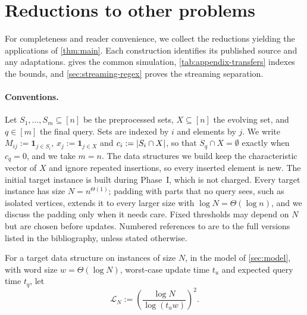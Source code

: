 \appendix
{}

\section{Reductions to other problems}\label{sec:graphs}

For completeness and reader convenience, we collect the reductions yielding the applications of \cref{thm:main}. Each construction identifies its published source and any adaptations.  gives the common simulation, \cref{tab:appendix-transfers} indexes the bounds, and \cref{sec:streaming-regex} proves the streaming separation.

\paragraph{Conventions.}
Let $S_1,\dots,S_m\subseteq[n]$ be the preprocessed sets, $X\subseteq[n]$ the evolving set, and $q\in[m]$ the final query. Sets are indexed by $i$ and elements by $j$. We write $M_{ij}:=\mathbf 1_{j\in S_i}$, $x_j:=\mathbf 1_{j\in X}$ and $c_i:=\left|S_i\cap X\right|$, so that $S_q\cap X=\emptyset$ exactly when $c_q=0$, and we take $m=n$. The data structures we build keep the characteristic vector of $X$ and ignore repeated insertions, so every inserted element is new. The initial target instance is built during Phase~I, which is not charged. Every target instance has size $N=n^{\Theta(1)}$; padding with parts that no query sees, such as isolated vertices, extends it to every larger size with $\log N=\Theta(\log n)$, and we discuss the padding only when it needs care. Fixed thresholds may depend on $N$ but are chosen before updates. Numbered references to \cite{abboud_popular_2014,henzinger_unifying_2015,abboud_popular_2016,van_den_brand_dynamic_2019,dallant_conditional_2022,jin_tight_2022} are to the full versions listed in the bibliography, unless stated otherwise.

For a target data structure on instances of size $N$, in the model of \cref{sec:model}, with word size $w=\Theta(\log N)$, worst-case update time $t_u$ and expected query time $t_q$, let
\[
\mathcal L_N:=\left(\frac{\log N}{\log(t_u w)}\right)^2.
\]


